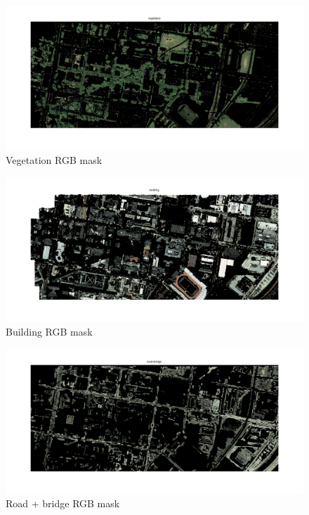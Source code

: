 \documentclass[english]{article}
\begin{document}
\begin{figure}[thpb]
\centering
\includegraphics[width=\textwidth]{vegetation}
\caption{Vegetation RGB mask}
\end{figure}

\begin{figure}[thpb]
\centering
\includegraphics[width=\textwidth]{building}
\caption{Building RGB mask}
\end{figure}

\begin{figure}[thpb]
\centering
\includegraphics[width=\textwidth]{road+bridge}
\caption{Road + bridge RGB mask}
\end{figure}
\end{document}

